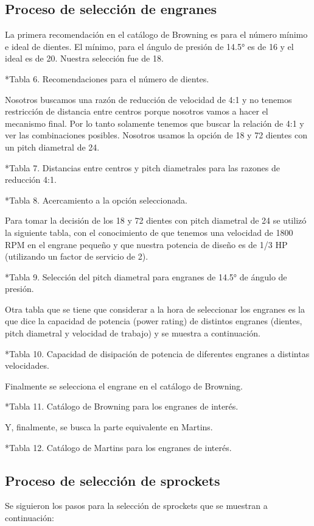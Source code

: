 \subsection{Proceso de selección de engranes}
La primera recomendación en el catálogo de Browning es para el número mínimo e ideal de dientes. El mínimo, para el ángulo de presión de 14.5° es de 16 y el ideal es de 20. Nuestra selección fue de 18.

*Tabla 6. Recomendaciones para el número de dientes.

Nosotros buscamos una razón de reducción de velocidad de 4:1 y no tenemos restricción de distancia entre centros porque nosotros vamos a hacer el mecanismo final. Por lo tanto solamente tenemos que buscar la relación de 4:1 y ver las combinaciones posibles. Nosotros usamos la opción de 18 y 72 dientes con un pitch diametral de 24.

*Tabla 7. Distancias entre centros y pitch diametrales para las razones de reducción 4:1.

*Tabla 8. Acercamiento a la opción seleccionada.

Para tomar la decisión de los 18 y 72 dientes con pitch diametral de 24 se utilizó la siguiente tabla, con el conocimiento de que tenemos una velocidad de 1800 RPM en el engrane pequeño y que nuestra potencia de diseño es de 1/3 HP (utilizando un factor de servicio de 2).

*Tabla 9. Selección del pitch diametral para engranes de 14.5° de ángulo de presión.

Otra tabla que se tiene que considerar a la hora de seleccionar los engranes es la que dice la capacidad de potencia (power rating) de distintos engranes (dientes, pitch diametral y velocidad de trabajo) y se muestra a continuación.

*Tabla 10. Capacidad de disipación de potencia de diferentes engranes a distintas velocidades.

Finalmente se selecciona el engrane en el catálogo de Browning.

*Tabla 11. Catálogo de Browning para los engranes de interés.

Y, finalmente, se busca la parte equivalente en Martins.

*Tabla 12. Catálogo de Martins para los engranes de interés.

\subsection{Proceso de selección de sprockets}
Se siguieron los pasos para la selección de sprockets que se muestran a continuación:

